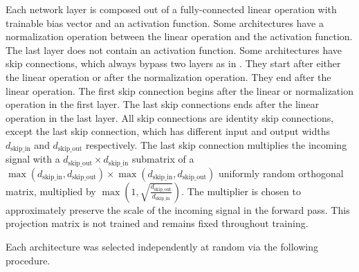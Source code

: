 \documentclass{article} %
\begin{document}
Each network layer is composed out of a fully-connected linear operation with trainable bias vector and an activation function. Some architectures have a normalization operation between the linear operation and the activation function. The last layer does not contain an activation function. Some architectures have skip connections, which always bypass two layers as in \citet{resNetTrueIdentity}. They start after either the linear operation or after the normalization operation. They end after the linear operation. The first skip connection begins after the linear or normalization operation in the first layer. The last skip connections ends after the linear operation in the last layer. All skip connections are identity skip connections, except the last skip connection, which has different input and output widths $d_\text{skip\_in}$ and $d_\text{skip\_out}$ respectively. The last skip connection multiplies the incoming signal with a $d_\text{skip\_out} \times d_\text{skip\_in}$ submatrix of a $\max(d_\text{skip\_in},d_\text{skip\_out}) \times \max(d_\text{skip\_in},d_\text{skip\_out})$ uniformly random orthogonal matrix, multiplied by $\max(1,\sqrt{\frac{d_\text{skip\_out}}{d_\text{skip\_in}}})$. The multiplier is chosen to approximately preserve the scale of the incoming signal in the forward pass. This projection matrix is not trained and remains fixed throughout training.

Each architecture was selected independently at random via the following procedure.
\end{document}
